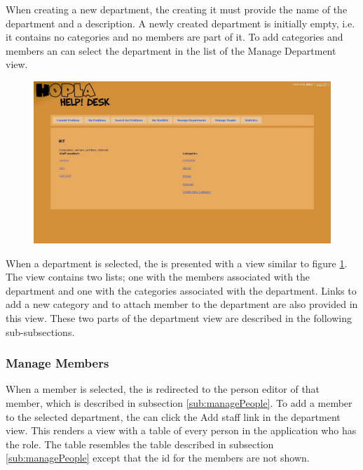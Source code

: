 When creating a new department, the \admin[] creating it must provide the name of the department and a description.
A newly created department is initially empty, i.e. it contains no categories and no \astaff[] members are part of it.
To add categories and \astaff[] members an \admin[] can select the department in the list of the Manage Department view.

\begin{figure}[H]
	\centering
		\includegraphics[width=1.00\textwidth, clip=true, trim=2.9cm 6cm 10cm 8cm]{input/implementation/program_presentation/department.png}
	\label{fig:department}
\end{figure}

When a department is selected, the \admin[] is presented with a view similar to figure \ref{fig:department}.
The view contains two lists; one with the \astaff[] members associated with the department and one with the categories associated with the department.
Links to add a new category and to attach \astaff[] member to the department are also provided in this view.
These two parts of the department view are described in the following sub-subsections.

\subsubsection{Manage \astaff[c] Members}
When a \astaff[] member is selected, the \admin[] is redirected to the person editor of that \astaff[] member, which is described in subsection \ref{sub:managePeople}.
To add a \astaff[] member to the selected department, the \admin[] can click the Add staff link in the department view.
This renders a view with a table of every person in the application who has the \astaff[] role.
The table resembles the table described in subsection \ref{sub:managePeople} except that the id for the \astaff[] members are not shown.

